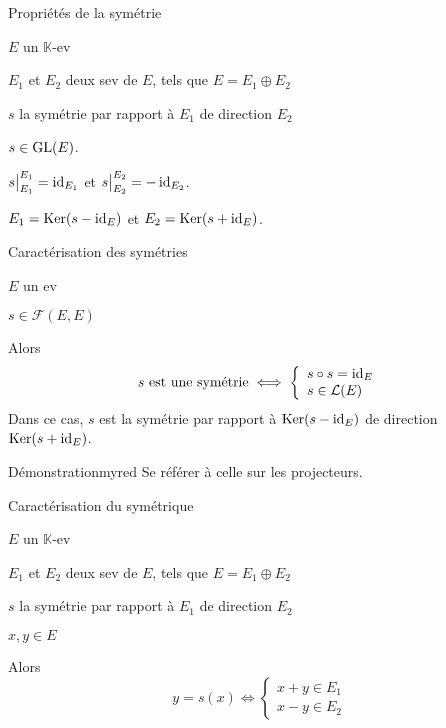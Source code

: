     \begin{prop}{Propriétés de la symétrie}{}
        \begin{soient}
            \item $E$ un $\mathbb{K}$-ev
            \item $E_1$ et $E_2$ deux sev de $E$, tels que $E = E_1 \oplus E_2$
            \item $s$ la symétrie par rapport à $E_1$ de direction $E_2$
        \end{soient}
        \begin{alors}
            \item $s \in \operatorname{GL}(E)$.
            \item $\left.\kern-\nulldelimiterspace s \vphantom{\big|} \right|_{E_1}^{E_1} = \id_{E_1}$ et $\left.\kern-\nulldelimiterspace s \vphantom{\big|} \right|_{E_2}^{E_2} = - \id_{E_2}$.
            \item $E_1 = \operatorname{Ker}(s-\operatorname{id}_E)$ et $E_2 = \operatorname{Ker}(s + \operatorname{id}_E)$.
        \end{alors}
    \end{prop}
    
    \begin{theo}{Caractérisation des symétries}{}
        \begin{soient}
            \item $E$ un ev
            \item $s \in \mathcal{F}(E,E)$
        \end{soient}
        Alors \[ s \text{ est une symétrie} \iff \left\{ \begin{array}{l}
            s \circ s = \operatorname{id}_E \\
            s \in \mathcal{L}(E)
        \end{array} \right. \]
        Dans ce cas, $s$ est la symétrie par rapport à $\operatorname{Ker}(s-\operatorname{id}_E)$ de direction $\operatorname{Ker}(s + \operatorname{id}_E)$.
    \end{theo}
    
    \begin{demo}{Démonstration}{myred}
        Se référer à celle sur les projecteurs.
    \end{demo}
    
    \begin{prop}{Caractérisation du symétrique}{}
        \begin{soient}
            \item $E$ un $\mathbb{K}$-ev
            \item $E_1$ et $E_2$ deux sev de $E$, tels que $E = E_1 \oplus E_2$
            \item $s$ la symétrie par rapport à $E_1$ de direction $E_2$
            \item $x,y \in E$
        \end{soient}
        Alors \[ y = s(x) \iff \left\{ \begin{array}{l}
            x + y \in E_1 \\
            x - y \in E_2
        \end{array} \right. \]
    \end{prop}
    

